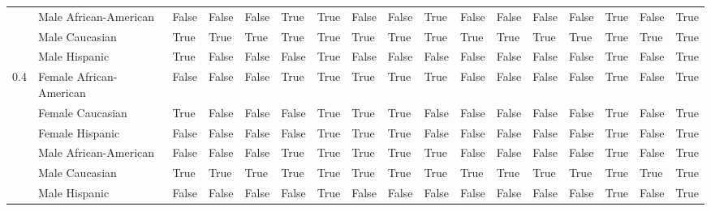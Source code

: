 \begin{tabular}{lllllllllllllllll}
    & Male African-American &       False &       False &          False &        True &              True &       False &           False &        True &         False &               False &       False &                  False &           True &                False &        True \\
    & Male Caucasian &        True &        True &           True &        True &              True &        True &            True &        True &          True &                True &        True &                   True &           True &                 True &        True \\
    & Male Hispanic &        True &       False &          False &       False &              True &       False &           False &       False &         False &               False &       False &                  False &           True &                False &        True \\
0.4 & Female African-American &       False &       False &          False &        True &              True &        True &            True &        True &         False &               False &       False &                  False &           True &                False &        True \\
    & Female Caucasian &        True &       False &          False &       False &              True &        True &            True &       False &         False &               False &       False &                  False &           True &                False &        True \\
    & Female Hispanic &       False &       False &          False &       False &              True &        True &            True &       False &         False &               False &       False &                  False &           True &                False &        True \\
    & Male African-American &       False &       False &          False &        True &              True &        True &            True &        True &         False &               False &       False &                  False &           True &                False &        True \\
    & Male Caucasian &        True &        True &           True &        True &              True &        True &            True &        True &          True &                True &        True &                   True &           True &                 True &        True \\
    & Male Hispanic &       False &       False &          False &       False &              True &       False &           False &       False &         False &               False &       False &                  False &           True &                False &        True \\
\bottomrule
\end{tabular}
